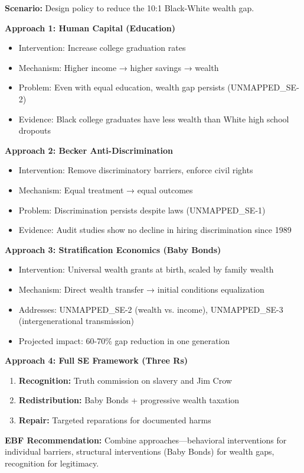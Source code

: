 \begin{tcolorbox}[colback=yellow!5!white,colframe=yellow!75!black,title=Worked Example: Comparing Policy Approaches]
\textbf{Scenario:} Design policy to reduce the 10:1 Black-White wealth gap.

\textbf{Approach 1: Human Capital (Education)}
\begin{itemize}
    \item Intervention: Increase college graduation rates
    \item Mechanism: Higher income → higher savings → wealth
    \item Problem: Even with equal education, wealth gap persists (UNMAPPED_SE-2)
    \item Evidence: Black college graduates have less wealth than White high school dropouts
\end{itemize}

\textbf{Approach 2: Becker Anti-Discrimination}
\begin{itemize}
    \item Intervention: Remove discriminatory barriers, enforce civil rights
    \item Mechanism: Equal treatment → equal outcomes
    \item Problem: Discrimination persists despite laws (UNMAPPED_SE-1)
    \item Evidence: Audit studies show no decline in hiring discrimination since 1989
\end{itemize}

\textbf{Approach 3: Stratification Economics (Baby Bonds)}
\begin{itemize}
    \item Intervention: Universal wealth grants at birth, scaled by family wealth
    \item Mechanism: Direct wealth transfer → initial conditions equalization
    \item Addresses: UNMAPPED_SE-2 (wealth vs. income), UNMAPPED_SE-3 (intergenerational transmission)
    \item Projected impact: 60-70\% gap reduction in one generation
\end{itemize}

\textbf{Approach 4: Full SE Framework (Three Rs)}
\begin{enumerate}
    \item \textbf{Recognition:} Truth commission on slavery and Jim Crow
    \item \textbf{Redistribution:} Baby Bonds + progressive wealth taxation
    \item \textbf{Repair:} Targeted reparations for documented harms
\end{enumerate}

\textbf{EBF Recommendation:} Combine approaches---behavioral interventions for individual barriers, structural interventions (Baby Bonds) for wealth gaps, recognition for legitimacy.
\end{tcolorbox}

